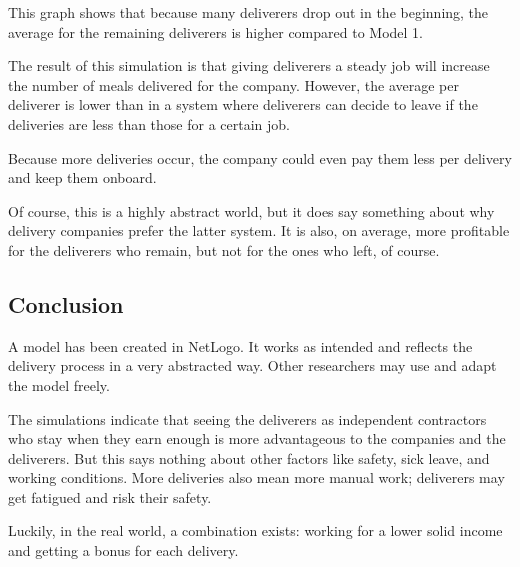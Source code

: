 This graph shows that because many deliverers drop out in the beginning, the average for the remaining deliverers is higher compared to Model 1.

The result of this simulation is that giving deliverers a steady job will increase the number of meals delivered for the company.
However, the average per deliverer is lower than in a system where deliverers can decide to leave if the deliveries are less than those for a certain job.

Because more deliveries occur, the company could even pay them less per delivery and keep them onboard.

Of course, this is a highly abstract world, but it does say something about why delivery companies prefer the latter system.
It is also, on average, more profitable for the deliverers who remain, but not for the ones who left, of course.

\subsection{Conclusion}\label{subsec:conclusion}
A model has been created in NetLogo. It works as intended and reflects the delivery process in a very abstracted way.
Other researchers may use and adapt the model freely.

The simulations indicate that seeing the deliverers as independent contractors who stay when they earn enough is more advantageous to the companies and the deliverers.
But this says nothing about other factors like safety, sick leave, and working conditions.
More deliveries also mean more manual work; deliverers may get fatigued and risk their safety.

Luckily, in the real world, a combination exists: working for a lower solid income and getting a bonus for each delivery.






